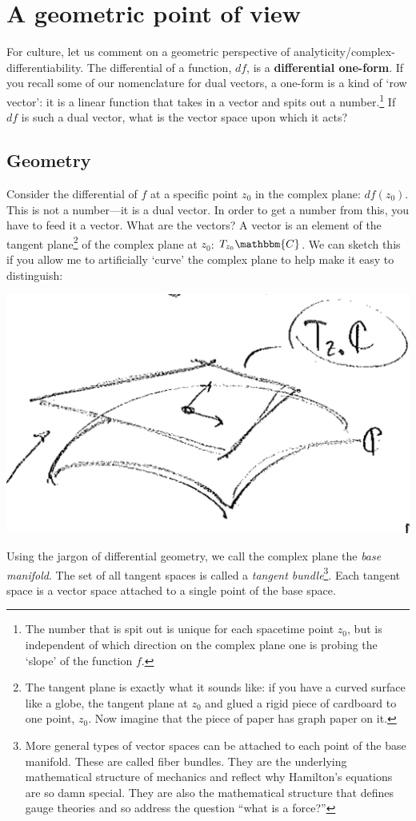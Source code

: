 \documentclass[
  11pt,
	colorful,
	raggedright,
]{tufte-style-thesis-flip}
\begin{document}
\section{A geometric point of view}
\label{sec:analytic:geometric}

For culture, let us comment on a geometric perspective of analyticity/complex-differentiability. The differential of a function, $df$, is a \textbf{differential one-form}. If you recall some of our nomenclature for dual vectors, a one-form is a kind of `row vector': it is a linear function that takes in a vector and spits out a number.\footnote{The number that is spit out is unique for each spacetime point $z_0$, but is independent of which direction on the complex plane one is probing the `slope' of the function $f$.} If $df$ is such a dual vector, what is the vector space upon which it acts?

\subsection{Geometry}

Consider the differential of $f$ at a specific point $z_0$ in the complex plane: $df(z_0)$. This is not a number---it is a dual vector. In order to get a number from this, you have to feed it a vector. What are the vectors? A vector is an element of the tangent plane\footnote{The tangent plane is exactly what it sounds like: if you have a curved surface like a globe, the tangent plane at $z_0$ and glued a rigid piece of cardboard to one point, $z_0$. Now imagine that the piece of paper has graph paper on it.} of the complex plane at $z_0$: $T_{z_0}\mathbbm{C}$. We can sketch this if you allow me to artificially `curve' the complex plane to help make it easy to distinguish:
\begin{center}
\includegraphics[width=.5\textwidth]{figures/lec13_mani.png}
\end{center}
Using the jargon of differential geometry, we call the complex plane the \emph{base manifold}. The set of all tangent spaces is called a \emph{tangent bundle}\footnote{More general types of vector spaces can be attached to each point of the base manifold. These are called fiber bundles. They are the underlying mathematical structure of mechanics and reflect why Hamilton's equations are so damn special. They are also the mathematical structure that defines gauge theories and so address the question ``what is a force?''}. Each tangent space is a vector space attached to a single point of the base space. 
\end{document}
